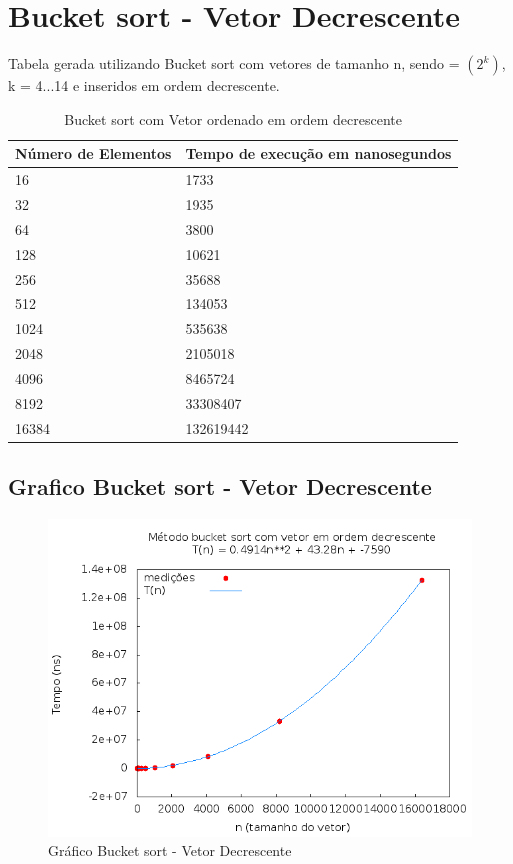 \documentclass[12pt,a4paper,twoside]{report}
\begin{document}
\section{Bucket sort - Vetor Decrescente}
Tabela gerada utilizando Bucket sort com vetores de tamanho n, sendo = $(2^k)$, k = 4...14 e inseridos em ordem decrescente.

\begin{table}[H]
\centering
\caption{Bucket sort com Vetor ordenado em ordem decrescente}
\label{my-label}
\begin{tabular}{|l|l|}
\hline
\multicolumn{1}{|c|}{\textbf{Número de Elementos}} & \multicolumn{1}{c|}{\textbf{Tempo de execução em nanosegundos}} \\ \hline
16 & 1733 \\ \hline
32 & 1935 \\ \hline
64 & 3800 \\ \hline
128 & 10621 \\ \hline
256 & 35688 \\ \hline
512 & 134053 \\ \hline
1024 & 535638 \\ \hline
2048 & 2105018 \\ \hline
4096 & 8465724 \\ \hline
8192 & 33308407 \\ \hline
16384 & 132619442 \\ \hline
\end{tabular}
\end{table}

\subsection{Grafico Bucket sort - Vetor Decrescente}
\begin{figure}[H]
    \centering
    \includegraphics[width=0.7\linewidth]{graficos/Bucket/vIntDecrescente/vIntDecrescente.png}
  \caption{Gráfico Bucket sort - Vetor Decrescente}
\end{figure}
\end{document}
